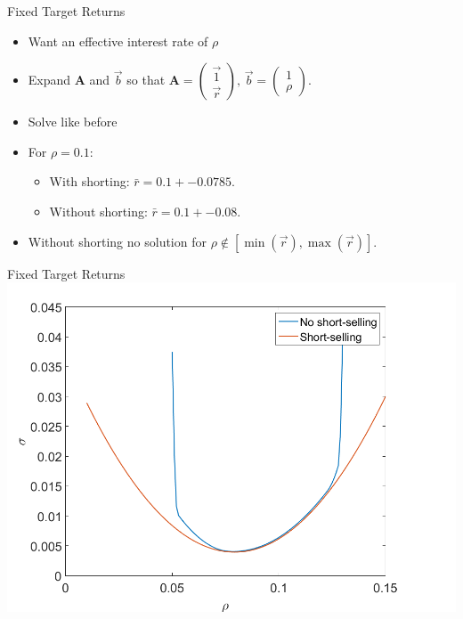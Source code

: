 \documentclass{beamer}
\numberwithin{equation}{section}
\newcommand{\mb}{\mathbf}
\begin{document}
\begin{frame}{Fixed Target Returns}
  \begin{itemize}
    \item{Want an effective interest rate of $\rho$}
    \item{Expand $\mb A$ and $\vec b$ so that $\mb A = \begin{pmatrix} \vec 1 \\ \vec r \end{pmatrix},\, \vec b = \begin{pmatrix} 1 \\ \rho \end{pmatrix}$.}
    \item{Solve like before}
    \item{For $\rho = 0.1$:}
    \begin{itemize}
      \item{With shorting: $\bar r = 0.1 +- 0.0785$.}
      \item{Without shorting: $\bar r = 0.1 +- 0.08$.}
    \end{itemize}
    \item{Without shorting no solution for $\rho \not \in [\min(\vec r), \max(\vec r)]$.}
  \end{itemize}
\end{frame}

\begin{frame}{Fixed Target Returns}
  \centering
  \includegraphics[width=1.0\textwidth]{../plots/r_sigma}
\end{frame}
\end{document}
